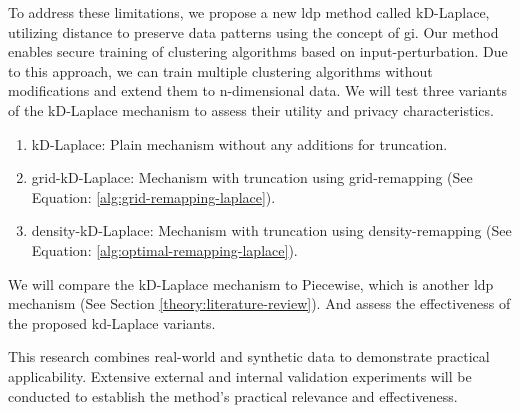 To address these limitations, we propose a new \gls{ldp} method called kD-Laplace, utilizing distance to preserve data patterns using the concept of \gls{gi}. \newline
Our method enables secure training of clustering algorithms based on input-perturbation.
Due to this approach, we can train multiple clustering algorithms without modifications and extend them to n-dimensional data.
We will test three variants of the kD-Laplace mechanism to assess their utility and privacy characteristics.
\begin{enumerate}
      \item kD-Laplace: Plain mechanism without any additions for truncation.
      \item grid-kD-Laplace: Mechanism with truncation using grid-remapping (See Equation: \ref{alg:grid-remapping-laplace}).
      \item density-kD-Laplace: Mechanism with truncation using density-remapping (See Equation: \ref{alg:optimal-remapping-laplace}).
\end{enumerate}
We will compare the kD-Laplace mechanism to Piecewise, which is another \gls{ldp} mechanism (See Section \ref{theory:literature-review}).
And assess the effectiveness of the proposed kd-Laplace variants.

This research combines real-world and synthetic data to demonstrate practical applicability.
Extensive external and internal validation experiments will be conducted to establish the method's practical relevance and effectiveness.


